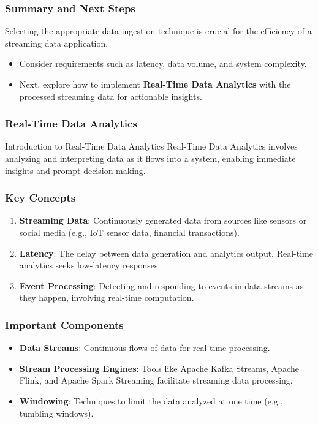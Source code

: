 \documentclass[aspectratio=169]{beamer}
\begin{document}
\begin{frame}
    \frametitle{Summary and Next Steps}
    Selecting the appropriate data ingestion technique is crucial for the efficiency of a streaming data application. 
    \begin{itemize}
        \item Consider requirements such as latency, data volume, and system complexity.
        \item Next, explore how to implement \textbf{Real-Time Data Analytics} with the processed streaming data for actionable insights.
    \end{itemize}
\end{frame}

\begin{frame}
    \frametitle{Real-Time Data Analytics}
    \begin{block}{Introduction to Real-Time Data Analytics}
        Real-Time Data Analytics involves analyzing and interpreting data as it flows into a system, enabling immediate insights and prompt decision-making.
    \end{block}
\end{frame}

\begin{frame}
    \frametitle{Key Concepts}
    \begin{enumerate}
        \item \textbf{Streaming Data}: Continuously generated data from sources like sensors or social media (e.g., IoT sensor data, financial transactions).
        
        \item \textbf{Latency}: The delay between data generation and analytics output. Real-time analytics seeks low-latency responses.

        \item \textbf{Event Processing}: Detecting and responding to events in data streams as they happen, involving real-time computation.
    \end{enumerate}
\end{frame}

\begin{frame}
    \frametitle{Important Components}
    \begin{itemize}
        \item \textbf{Data Streams}: Continuous flows of data for real-time processing.
        
        \item \textbf{Stream Processing Engines}: Tools like Apache Kafka Streams, Apache Flink, and Apache Spark Streaming facilitate streaming data processing.

        \item \textbf{Windowing}: Techniques to limit the data analyzed at one time (e.g., tumbling windows).
    \end{itemize}
\end{frame}
\end{document}

